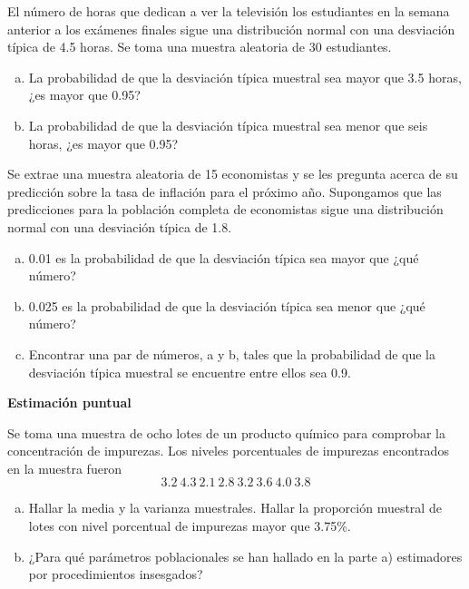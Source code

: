 \documentclass[12pt]{article}\usepackage[]{graphicx}\usepackage[]{color}
\begin{document}
\begin{prob} El número de horas que dedican a ver la televisión
los estudiantes en la semana anterior a los exámenes finales
sigue una distribución normal con una desviación típica de 4.5
horas. Se toma una muestra aleatoria de 30 estudiantes.

\begin{enumerate}[a)]
\item La probabilidad  de que la desviación típica muestral sea
mayor que 3.5 horas, ¿es mayor que 0.95?
\item La probabilidad de que la desviación típica muestral sea
menor que seis horas, ¿es mayor que 0.95?
\end{enumerate}
\end{prob}
\begin{prob} Se extrae una muestra aleatoria de 15 economistas
y se les pregunta acerca de su predicción sobre la tasa de
inflación para el próximo año. Supongamos que las predicciones
para la población completa de economistas sigue una
distribución normal con una desviación típica de 1.8.
\begin{enumerate}[a)]
\item 0.01 es la probabilidad de que la desviación típica sea
mayor que ¿qué número?
\item 0.025 es la probabilidad de que la desviación típica sea
menor que ¿qué número?
\item Encontrar una par de números, a y b, tales que la
probabilidad de que la desviación típica muestral se encuentre
entre ellos sea 0.9.
\end{enumerate}
\end{prob}


\newpage
\textbf{Estimación puntual}

\begin{prob}
Se toma una muestra de ocho lotes de un producto químico para
comprobar la concentración de impurezas. Los niveles porcentuales
de impurezas encontrados en la muestra fueron
$$3.2 \ 4.3 \ 2.1 \ 2.8\ 3.2 \ 3.6\ 4.0\ 3.8$$
\begin{enumerate}[a)]
\item Hallar la media y la varianza muestrales.
Hallar la proporción muestral de lotes con nivel
porcentual de impurezas mayor que 3.75\%.
\item ¿Para qué parámetros poblacionales  se han hallado en la
parte  a) estimadores por procedimientos insesgados?
\end{enumerate}
\end{prob}
%
%
\end{document}
